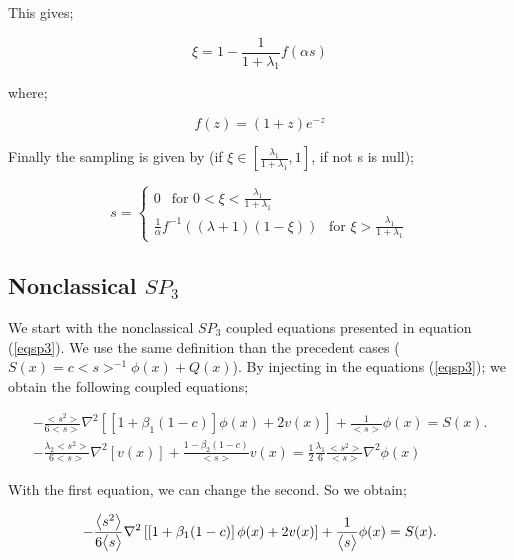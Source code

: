 \documentclass[a4paper, 12pt]{report}
\newcommand{\bl}{\big<}
\newcommand{\bg}{\big>}
\begin{document}
This gives;

\begin{equation}
\xi = 1 - \frac{1}{1+\lambda_1}f(\alpha s)
\end{equation}

where;

\begin{equation}
f(z) = (1+z)e^{-z}
\end{equation}

Finally the sampling is given by (if $\xi \in [\frac{\lambda_1}{1+\lambda_1},1]$, if not s is null);

\begin{center}
\begin{equation}
s = \begin{cases}
0  \ \ \text{ for } 0 < \xi < \frac{\lambda_1}{1+\lambda_1} \\ 
\frac{1}{\alpha}f^{-1}((\lambda+1)(1-\xi)) \ \ \text{ for }  \xi > \frac{\lambda_1}{1+\lambda_1} 
\end{cases}
\end{equation}
\end{center}
\subsection{Nonclassical $SP_3$}

We start with the nonclassical $SP_3$ coupled equations presented in equation (\ref{eqsp3}).
We use the same definition than the precedent cases ($S(x) = c\bl s \bg^{-1} \phi(x) + Q(x)$).
By injecting in the equations (\ref{eqsp3}); we obtain the following coupled equations;

\begin{align}
-\frac{\bl s^2 \bg}{6\bl s \bg} \nabla^2 \left[\left[1+\beta_1(1-c)\right]\phi(x)+ 2v(x)\right] + \frac{1}{\bl s \bg} \phi(x) = S(x). \\
-\frac{\lambda_2 \bl s^2 \bg}{6\bl s \bg} \nabla^2 \left[v(x)\right] + \frac{1-\beta_2(1-c)}{\bl s \bg} v(x) = \frac{1}{2}\frac{\lambda_1}{6}\frac{\bl s^2 \bg}{\bl s \bg} \nabla^2 \phi(x)
\end{align}

With the first equation, we can change the second. So we obtain;

\begin{equation}
-\frac{\bl s^2 \bg}{6\bl s \bg} \nabla^2 \left[\left[1+\beta_1(1-c)\right]\phi(x)+ 2v(x)\right] + \frac{1}{\bl s \bg} \phi(x) = S(x). \\
\end{equation}
\end{document}
